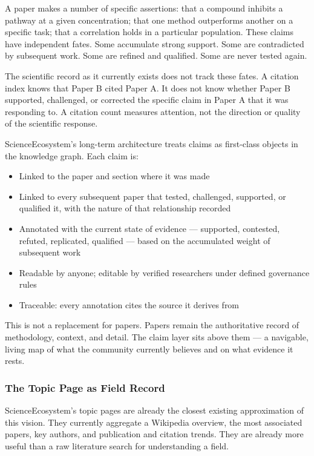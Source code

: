 A paper makes a number of specific assertions: that a compound inhibits a
pathway at a given concentration; that one method outperforms another on a
specific task; that a correlation holds in a particular population. These claims
have independent fates. Some accumulate strong support. Some are contradicted by
subsequent work. Some are refined and qualified. Some are never tested again.

The scientific record as it currently exists does not track these fates. A
citation index knows that Paper B cited Paper A. It does not know whether Paper
B supported, challenged, or corrected the specific claim in Paper A that it was
responding to. A citation count measures attention, not the direction or quality
of the scientific response.

ScienceEcosystem's long-term architecture treats claims as first-class objects
in the knowledge graph. Each claim is:

\begin{itemize}
  \item Linked to the paper and section where it was made
  \item Linked to every subsequent paper that tested, challenged, supported,
        or qualified it, with the nature of that relationship recorded
  \item Annotated with the current state of evidence — supported, contested,
        refuted, replicated, qualified — based on the accumulated weight of
        subsequent work
  \item Readable by anyone; editable by verified researchers under defined
        governance rules
  \item Traceable: every annotation cites the source it derives from
\end{itemize}

This is not a replacement for papers. Papers remain the authoritative record of
methodology, context, and detail. The claim layer sits above them — a
navigable, living map of what the community currently believes and on what
evidence it rests.

\subsubsection*{The Topic Page as Field Record}

ScienceEcosystem's topic pages are already the closest existing approximation
of this vision. They currently aggregate a Wikipedia overview, the most
associated papers, key authors, and publication and citation trends. They are
already more useful than a raw literature search for understanding a field.

